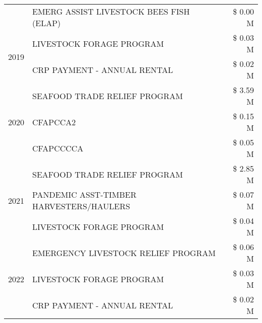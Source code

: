 \begin{tabular}{llr}
 & EMERG ASSIST LIVESTOCK BEES FISH (ELAP) & \$ 0.00 M \\
\cline{1-3}
\multirow[t]{2}{*}{2019} & LIVESTOCK FORAGE PROGRAM & \$ 0.03 M \\
 & CRP PAYMENT - ANNUAL RENTAL & \$ 0.02 M \\
\cline{1-3}
\multirow[t]{3}{*}{2020} & SEAFOOD TRADE RELIEF PROGRAM & \$ 3.59 M \\
 & CFAPCCA2 & \$ 0.15 M \\
 & CFAPCCCCA & \$ 0.05 M \\
\cline{1-3}
\multirow[t]{3}{*}{2021} & SEAFOOD TRADE RELIEF PROGRAM & \$ 2.85 M \\
 & PANDEMIC ASST-TIMBER HARVESTERS/HAULERS & \$ 0.07 M \\
 & LIVESTOCK FORAGE PROGRAM & \$ 0.04 M \\
\cline{1-3}
\multirow[t]{3}{*}{2022} & EMERGENCY LIVESTOCK RELIEF PROGRAM & \$ 0.06 M \\
 & LIVESTOCK FORAGE PROGRAM & \$ 0.03 M \\
 & CRP PAYMENT - ANNUAL RENTAL & \$ 0.02 M \\
\cline{1-3}
\bottomrule
\end{tabular}
